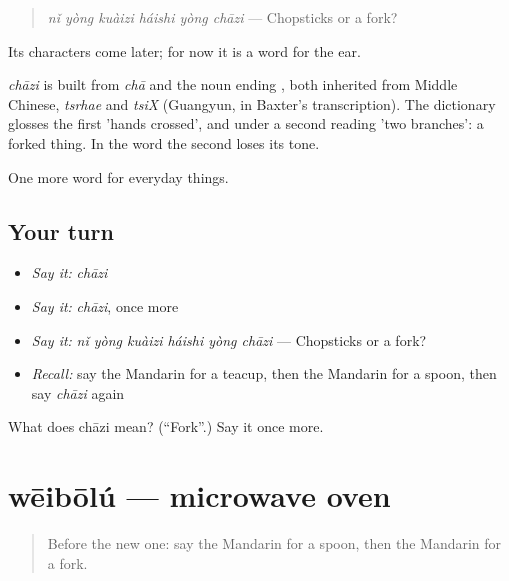 \begin{quote}
\emph{nǐ yòng kuàizi háishi yòng chāzi} — Chopsticks or a fork?
\end{quote}

Its characters come later; for now it is a word for the ear.

\begin{cousinweb}
\emph{chāzi} is built from \emph{chā} and the noun ending , both inherited from Middle Chinese, \emph{tsrhae} and \emph{tsiX} (Guangyun, in Baxter's transcription). The dictionary glosses the first 'hands crossed', and under a second reading 'two branches': a forked thing. In the word the second loses its tone.
\end{cousinweb}

\begin{grammarlens}[title={What you've built}]
One more word for everyday things.
\end{grammarlens}

\subsection*{Your turn}
\begin{itemize}
\raggedright
  \item \emph{Say it:} \emph{chāzi}
  \item \emph{Say it:} \emph{chāzi}, once more
  \item \emph{Say it:} \emph{nǐ yòng kuàizi háishi yòng chāzi} — Chopsticks or a fork?
  \item \emph{Recall:} say the Mandarin for a teacup, then the Mandarin for a spoon, then say \emph{chāzi} again
\end{itemize}

\begin{tcolorbox}[breakable,colback=teal!4,colframe=teal!35!black,title={Before you move on}]
What does chāzi mean? (\textquotedblleft{}Fork\textquotedblright{}.) Say it once more.
\end{tcolorbox}
\section[wēibōlú]{wēibōlú — microwave oven}

\label{lesson:ZH-C170-weibolu}



\begin{quote}
Before the new one: say the Mandarin for a spoon, then the Mandarin for a fork.
\end{quote}

